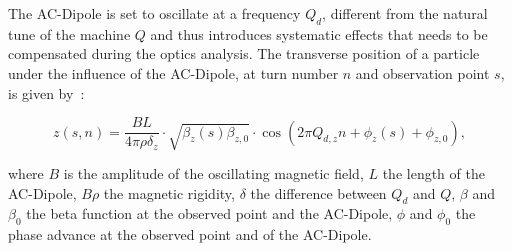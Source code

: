 The AC-Dipole is set to oscillate at a frequency $Q_d$, different from the natural tune of the
machine $Q$ and thus introduces systematic effects that needs to be compensated during the optics
analysis. The transverse position of a particle under the influence of the AC-Dipole, at turn number
$n$ and observation point $s$, is given
by~\cite{serrano_lhc_2010,tomas_normal_2002,white_direct_2013}:

\begin{equation}
z(s, n) = \frac{BL}{4\pi\rho\delta_z} \cdot \sqrt{\beta_z(s) \beta_{z,0}} \cdot \cos \left( 2 \pi Q_{d,z}n + \phi_z(s) + \phi_{z,0}\right),
\label{eq:ac_dipole}
\end{equation}

where $B$ is the amplitude of the oscillating magnetic field, $L$ the length of the AC-Dipole,
$B\rho$ the magnetic rigidity, $\delta$ the difference between $Q_d$ and $Q$, $\beta$ and $\beta_0$
the beta function at the observed point and the AC-Dipole, $\phi$ and $\phi_0$ the phase advance at
the observed point and of the AC-Dipole.